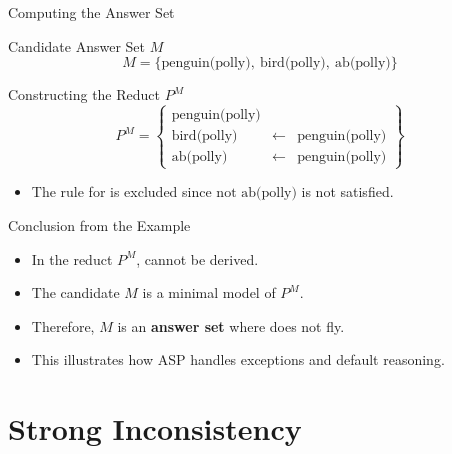 \begin{frame}{Computing the Answer Set}
    \begin{block}{Candidate Answer Set \(M\)}
        \[
            M = \{\text{penguin(polly)},\ \text{bird(polly)},\ \text{ab(polly)}\}
        \]
    \end{block}
    \begin{block}{Constructing the Reduct \(P^M\)}
        \[
            P^M = \left\{
            \begin{array}{lcl}
                \text{penguin(polly)} &            &                       \\
                \text{bird(polly)}    & \leftarrow & \text{penguin(polly)} \\
                \text{ab(polly)}      & \leftarrow & \text{penguin(polly)}
            \end{array}
            \right\}
        \]
        \begin{itemize}
            \item The rule for  is excluded since \(\text{not } \text{ab(polly)}\) is not satisfied.
        \end{itemize}
    \end{block}
\end{frame}

\begin{frame}{Conclusion from the Example}
    \begin{itemize}
        \item In the reduct \(P^M\),  cannot be derived.
        \item The candidate \(M\) is a minimal model of \(P^M\).
        \item Therefore, \(M\) is an \textbf{answer set} where  does not fly.
        \item This illustrates how ASP handles exceptions and default reasoning.
    \end{itemize}
\end{frame}

\section{Strong Inconsistency}

